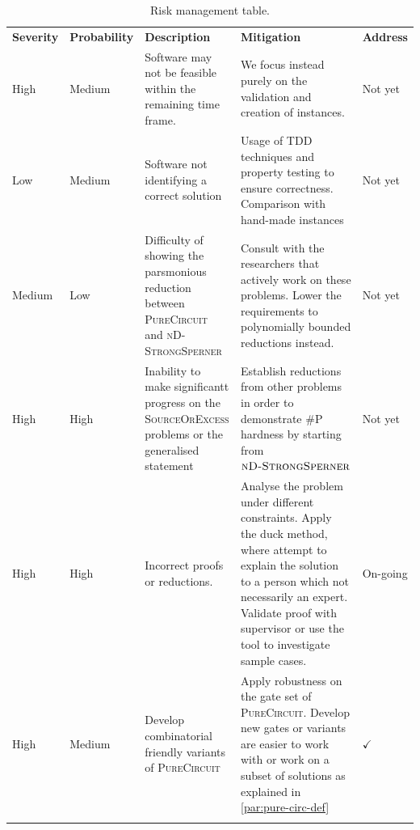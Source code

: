\begin{xltabular}{0.95\linewidth}{|Z{1.2cm}|Z{1.75cm}|Y|Y|Z{1.2cm}|}
        \hline
        \textbf{Severity} & \textbf{Probability} & \textbf{Description} & \textbf{Mitigation} & \textbf{Address} \\
        \hhline{|=|=|=|=|=|}
        High   & Medium & Software may not be feasible within the remaining time frame. & We focus instead purely on the validation and creation of instances. & Not yet      \\ \hline
        Low    & Medium & Software not identifying a correct solution & Usage of TDD techniques and property testing to ensure correctness.  Comparison with hand-made instances & Not yet      \\ \hline
        Medium & Low    & Difficulty of showing the parsmonious reduction between  \textsc{PureCircuit} and  \textsc{nD-StrongSperner} & Consult with the researchers that actively work on these problems. Lower the requirements
               to polynomially bounded reductions instead. &  Not yet \\ \hline
        High   & High   & Inability to make significantt progress on the \textsc{SourceOrExcess} problems or the generalised statement &
        Establish reductions from other problems in order to demonstrate \textsc{\#P} hardness by starting from $\textsc{nD-StrongSperner}$& Not yet \\ \hline
        High   & High   & Incorrect proofs or reductions. &
        Analyse the problem under different constraints.
            Apply the duck method, where attempt to explain the solution to a person which not necessarily an expert. Validate proof with supervisor or
               use the tool to investigate sample cases. & On-going  \\ \hline
        High   & Medium & Develop combinatorial friendly variants of \textsc{PureCircuit} & Apply robustness on the gate set of \textsc{PureCircuit}. Develop new gates or variants are easier to work with or work
        on a subset of solutions as explained in \ref{par:pure-circ-def} & $\checkmark$  \\ \hline
        \caption{Risk management table.} \label{tab:management:risk-management}
\end{xltabular}

%
%
